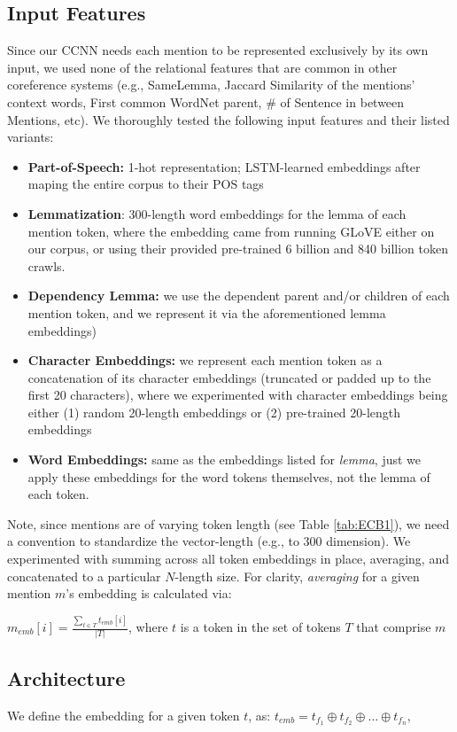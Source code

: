 \documentclass[11pt,a4paper]{article}
\begin{document}
\subsection{Input Features}
\label{sec:features}
Since our CCNN needs each mention to be represented exclusively by its own input, we used none of the relational features that are common in other coreference systems (e.g., SameLemma, Jaccard Similarity of the mentions' context words, First common WordNet parent, \# of Sentence in between Mentions, etc).  We thoroughly tested the following input features and their listed variants:
\begin{itemize}
  \item \textbf{Part-of-Speech:} 1-hot representation; LSTM-learned embeddings after maping the entire corpus to their POS tags
  \item \textbf{Lemmatization}: 300-length word embeddings for the lemma of each mention token, where the embedding came from running GLoVE \cite{pennington2014glove} either on our corpus, or using their provided pre-trained 6 billion and 840 billion token crawls.
  \item \textbf{Dependency Lemma:} we use the dependent parent and/or children of each mention token, and we represent it via the aforementioned lemma embeddings)
  \item \textbf{Character Embeddings:} we represent each mention token as a concatenation of its character embeddings (truncated or padded up to the first 20 characters), where we experimented with character embeddings being either (1) random 20-length embeddings or (2) pre-trained 20-length embeddings
  \item \textbf{Word Embeddings:} same as the embeddings listed for \textit{lemma}, just we apply these embeddings for the word tokens themselves, not the lemma of each token.
\end{itemize}
Note, since mentions are of varying token length (see Table \ref{tab:ECB1}), we need a convention to standardize the vector-length (e.g., to 300 dimension).  We experimented with summing across all token embeddings in place, averaging, and concatenated to a particular $N$-length size.  For clarity, \textit{averaging} for a given mention $m$'s embedding is calculated via:

$m_{emb}[i] = \frac{\sum_{t \in T}t_{emb}[i]}{|T|}$, where $t$ is a token in the set of tokens $T$ that comprise $m$

\subsection{Architecture}
We define the embedding for a given token $t$, as: $t_{emb} = t_{f_{1}} \oplus t_{f_{2}} \oplus \ldots \oplus t_{f_{n}},$
\end{document}

